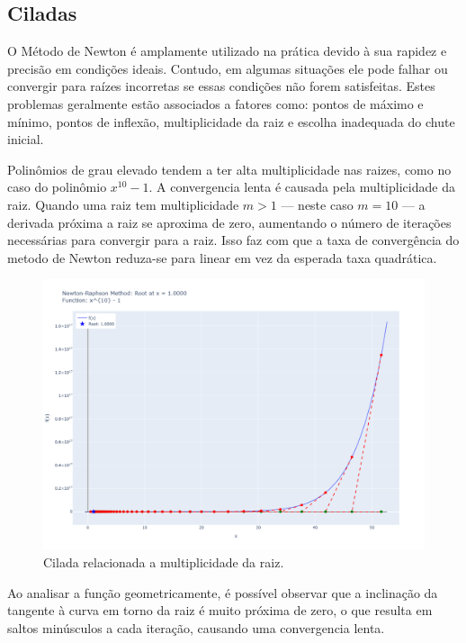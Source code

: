 \subsection{Ciladas}
O Método de Newton é amplamente utilizado na prática devido à sua rapidez e precisão em condições ideais. Contudo, em algumas situações ele pode falhar ou convergir para raízes incorretas se essas condições não forem satisfeitas. Estes problemas geralmente estão associados a fatores como: pontos de máximo e mínimo, pontos de inflexão, multiplicidade da raiz e escolha inadequada do chute inicial.

Polinômios de grau elevado tendem a ter alta multiplicidade nas raizes, como no caso do polinômio $x^{10} - 1$.
A convergencia lenta é causada pela multiplicidade da raiz. Quando uma raiz tem multiplicidade $m > 1$ — neste caso $m = 10$ — a derivada próxima a raiz se aproxima de zero, aumentando o número de iterações necessárias para convergir para a raiz.
Isso faz com que a taxa de convergência do metodo de Newton reduza-se para linear em vez da esperada taxa quadrática.
\begin{figure}[H]
    \centering 
    \includegraphics[width=1\textwidth]{Imagens/pitfalls/x_10-1.png}
    \caption{Cilada relacionada a multiplicidade da raiz.}
    \label{fig:ciladaMultRaiz}
\end{figure}
Ao analisar a função geometricamente, é possível observar que a inclinação da tangente à curva em torno da raiz é muito próxima de zero, o que resulta em saltos minúsculos a cada iteração, causando uma convergencia lenta.


